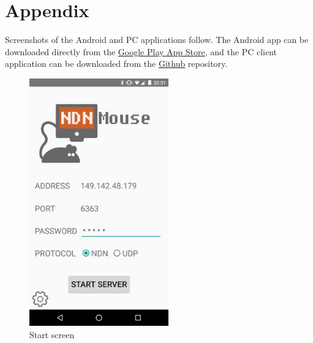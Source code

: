 \documentclass{sig-alternate}
\renewcommand\_{\textunderscore\allowbreak}  %
\begin{document}


\section{Appendix}
Screenshots of the Android and PC applications follow. The Android app can be downloaded directly from the \href{https://play.google.com/store/apps/details?id=edu.ucla.cs.ndnmouse}{Google Play App Store}, and the PC client application can be downloaded from the \href{https://github.com/wminner/ndnMouse/tree/master/pc_client}{Github} repository.

\begin{figure}[ht]
	\hypertarget{fig:start}{}
	\centering
	\caption{Start screen}
	\includegraphics[width=6cm]{screenshots/start}
\end{figure}
\end{document}
